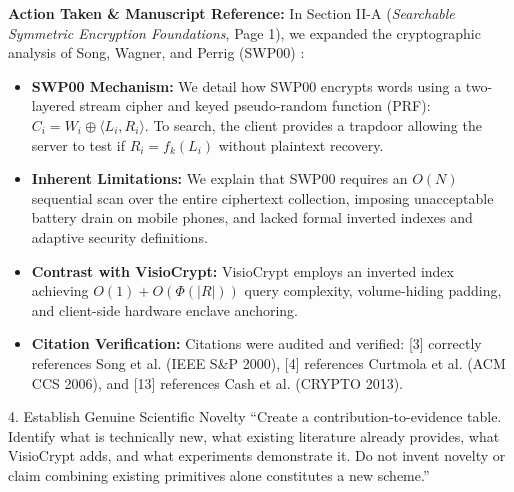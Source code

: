 \documentclass[11pt,a4paper]{article}
\begin{document}
\begin{responsebox}
\textbf{Action Taken \& Manuscript Reference:} In Section II-A (\emph{Searchable Symmetric Encryption Foundations}, Page 1), we expanded the cryptographic analysis of Song, Wagner, and Perrig (SWP00) \cite{song2000}:
\begin{itemize}[itemsep=2pt]
    \item \textbf{SWP00 Mechanism:} We detail how SWP00 encrypts words using a two-layered stream cipher and keyed pseudo-random function (PRF): $C_i = W_i \oplus \langle L_i, R_i \rangle$. To search, the client provides a trapdoor allowing the server to test if $R_i = f_k(L_i)$ without plaintext recovery.
    \item \textbf{Inherent Limitations:} We explain that SWP00 requires an $O(N)$ sequential scan over the entire ciphertext collection, imposing unacceptable battery drain on mobile phones, and lacked formal inverted indexes and adaptive security definitions.
    \item \textbf{Contrast with VisioCrypt:} VisioCrypt employs an inverted index achieving $O(1) + O(\Phi(|R|))$ query complexity, volume-hiding padding, and client-side hardware enclave anchoring.
    \item \textbf{Citation Verification:} Citations were audited and verified: [3] correctly references Song et al. (IEEE S\&P 2000), [4] references Curtmola et al. (ACM CCS 2006), and [13] references Cash et al. (CRYPTO 2013).
\end{itemize}
\end{responsebox}

\vspace{1em}

\begin{reviewbox}{4. Establish Genuine Scientific Novelty}
``Create a contribution-to-evidence table. Identify what is technically new, what existing literature already provides, what VisioCrypt adds, and what experiments demonstrate it. Do not invent novelty or claim combining existing primitives alone constitutes a new scheme.''
\end{reviewbox}
\end{document}
